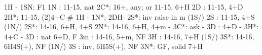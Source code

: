 1H - 1SN: F1
1N : 11-15, nat
2C*: 16+, any; or 11-15, 6+H
2D : 11-15, 4+D
2H*: 11-15, (2)4+C
# 1H - 1N*; 2DH- 2S*: inv raise in m
(1S/) 2S : 11-15, 4+S
(1N/) 2S*: 14-16, 6+H, 4+S
2N*: 14-16, 6+H, 4+m
   - 3C*: ask
        - 3D : 4+D
        - 3H*: 4+C
   - 3D : nat 6+D, F
3m : 14-16, 5+m, NF
3H : 14-16, 7+H
(1S/) 3S*: 14-16, 6H4S(+), NF
(1N/) 3S : inv, 6H5S(+), NF
3N*: GF, solid 7+H